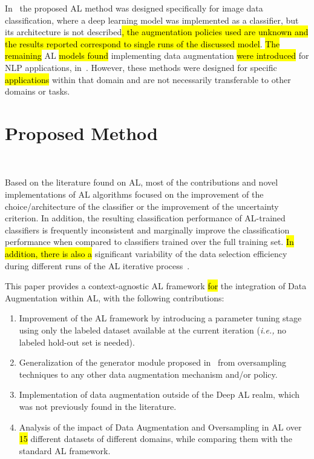 \documentclass[preprint, 12pt]{elsarticle}
\begin{document}
In~\cite{Ma2020} the proposed AL method was designed specifically for image
data classification, where a deep learning model was implemented as a
classifier, but its architecture is not described\hl{, the augmentation
policies used are unknown and the results reported correspond to single runs
of the discussed model}. \hl{The remaining} AL \hl{models found} implementing
data augmentation \hl{were introduced} for NLP applications,
in~\cite{Quteineh2020, Li2021framework}. However, these methods were designed
for specific \hl{applications} within that domain and are not necessarily
transferable to other domains or tasks.

\section{Proposed Method}~\label{sec:proposed_method}

Based on the literature found on AL, most of the contributions and novel
implementations of AL algorithms focused on the improvement of the
choice/architecture of the classifier or the improvement of the uncertainty
criterion. In addition, the resulting classification performance of AL-trained
classifiers is frequently inconsistent and marginally improve the
classification performance when compared to classifiers trained over the full
training set. \hl{In addition, there is also a} significant variability of the
data selection efficiency during different runs of the AL iterative
process~\cite{Fonseca2021}.  


 
This paper provides a context-agnostic AL framework \hl{for} the integration
of Data Augmentation within AL, with the following contributions:

\begin{enumerate}
    \item Improvement of the AL framework by introducing a parameter tuning
        stage using only the labeled dataset available at the current
        iteration (\textit{i.e.,} no labeled hold-out set is needed).
    \item Generalization of the generator module proposed
        in~\cite{Fonseca2021} from oversampling techniques to any other data
        augmentation mechanism and/or policy.
    \item Implementation of data augmentation outside of the Deep AL realm,
        which was not previously found in the literature.
    \item Analysis of the impact of Data Augmentation and Oversampling in AL
        over \hl{15} different datasets of different domains, while comparing them
        with the standard AL framework.
\end{enumerate}
\end{document}
